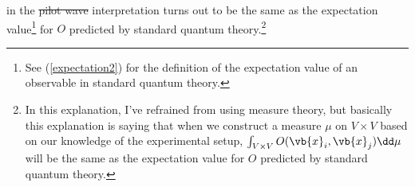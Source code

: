 \documentclass[12pt]{report}
\providecommand{\DIFadd}[1]{{\protect\color{blue}\uwave{#1}}} %
\providecommand{\DIFdel}[1]{{\protect\color{red}\sout{#1}}}                      %
\providecommand{\DIFaddbegin}{} %
\providecommand{\DIFaddend}{} %
\providecommand{\DIFdelbegin}{} %
\providecommand{\DIFdelend}{} %
\begin{document}
\DIFdelend \DIFaddbegin {}\DIFaddend %
in the \DIFdelbegin \DIFdel{pilot wave }\DIFdelend \DIFaddbegin \DIFadd{Bohmian }\DIFaddend interpretation turns out to be the same as the expectation value\footnote{See (\ref{expectation2}) for the definition of the expectation value of an observable in standard quantum theory.} for $O$ predicted by standard quantum theory.\footnote{In this explanation, I've refrained from using measure theory, but basically this explanation is saying that when we construct a measure $\mu$ on $V\times V$ based on our knowledge of the experimental setup,  $\int_{V\times V}O(\vb{x}_i, \vb{x}_j)\dd\mu$ will be the same as the expectation value for $O$ predicted by standard quantum theory. }
\end{document}
